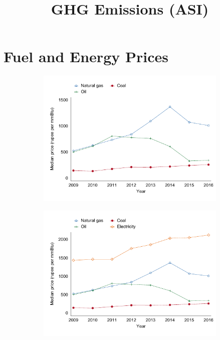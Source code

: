 \documentclass[12pt,notitlepage]{article}
\title{GHG Emissions (ASI)}
\author{}
\date{}
\begin{document}
\maketitle

\section{Fuel and Energy Prices}

\begin{figure}[!htpb]
\centering
\caption{IPO and Profitability}
\begin{subfigure}{.49\textwidth}
    \centering
 \includegraphics[scale=0.9]{../Output/Graphs/FuelPrices_Year.pdf}
\end{subfigure}%
\begin{subfigure}{.49\textwidth}
    \centering
 \includegraphics[scale=0.9]{../Output/Graphs/EnergyPrices_Year.pdf}
\end{subfigure}
\end{figure}
\pagebreak
\end{document}
